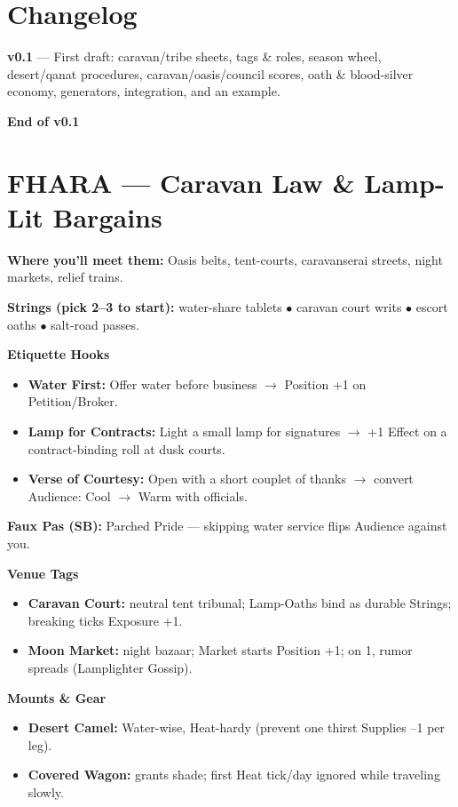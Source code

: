 \documentclass[11pt]{article}
\begin{document}
\section{Changelog}

\textbf{v0.1} --- First draft: caravan/tribe sheets, tags \& roles, season wheel, desert/qanat procedures, caravan/oasis/council scores, oath \& blood-silver economy, generators, integration, and an example.

\textbf{End of v0.1}


\section*{FHARA --- Caravan Law \& Lamp-Lit Bargains}

\textbf{Where you'll meet them:} Oasis belts, tent-courts, caravanserai streets, night markets, relief trains.

\textbf{Strings (pick 2--3 to start):} water-share tablets $\bullet$ caravan court writs $\bullet$ escort oaths $\bullet$ salt-road passes.

\textbf{Etiquette Hooks}
\begin{itemize}
\item \textbf{Water First:} Offer water before business $\rightarrow$ Position +1 on Petition/Broker.
\item \textbf{Lamp for Contracts:} Light a small lamp for signatures $\rightarrow$ +1 Effect on a contract-binding roll at dusk courts.
\item \textbf{Verse of Courtesy:} Open with a short couplet of thanks $\rightarrow$ convert Audience: Cool $\rightarrow$ Warm with officials.
\end{itemize}

\textbf{Faux Pas (SB):} Parched Pride --- skipping water service flips Audience against you.

\textbf{Venue Tags}
\begin{itemize}
\item \textbf{Caravan Court:} neutral tent tribunal; Lamp-Oaths bind as durable Strings; breaking ticks Exposure +1.
\item \textbf{Moon Market:} night bazaar; Market starts Position +1; on 1, rumor spreads (Lamplighter Gossip).
\end{itemize}

\textbf{Mounts \& Gear}
\begin{itemize}
\item \textbf{Desert Camel:} Water-wise, Heat-hardy (prevent one thirst Supplies --1 per leg).
\item \textbf{Covered Wagon:} grants shade; first Heat tick/day ignored while traveling slowly.
\end{itemize}
\end{document}
